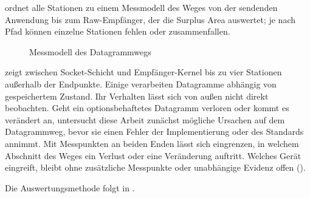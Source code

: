  ordnet alle Stationen zu einem Messmodell des Weges von der sendenden Anwendung bis zum
Raw-Empfänger, der die Surplus Area auswertet; je nach Pfad können einzelne Stationen fehlen oder zusammenfallen.

\begin{figure}[H]
  \centering
  \caption{Messmodell des Datagrammwegs}
  \label{fig:akteurskette}
\end{figure}

 zeigt zwischen Socket-Schicht und Empfänger-Kernel bis zu vier Stationen außerhalb der
Endpunkte. Einige verarbeiten Datagramme abhängig von gespeichertem Zustand. Ihr Verhalten lässt sich von außen nicht
direkt beobachten. Geht ein optionsbehaftetes Datagramm verloren oder kommt es verändert an, untersucht diese Arbeit
zunächst mögliche Ursachen auf dem Datagrammweg, bevor sie einen Fehler der Implementierung oder des Standards annimmt.
Mit Messpunkten an beiden Enden lässt sich eingrenzen, in welchem Abschnitt des Weges ein Verlust oder eine Veränderung
auftritt. Welches Gerät eingreift, bleibt ohne zusätzliche Messpunkte oder unabhängige Evidenz offen
().

Die Auswertungsmethode folgt in .
